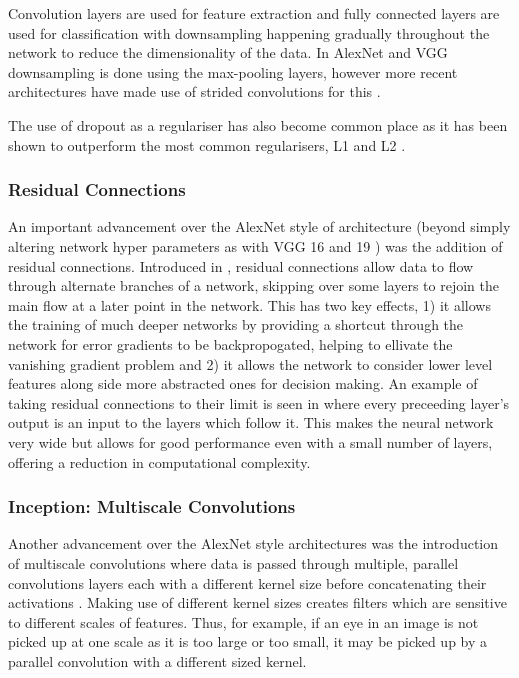 Convolution layers are used for feature extraction and fully connected layers are used for classification with downsampling happening gradually throughout the network to reduce the dimensionality of the data. In AlexNet and VGG downsampling is done using the max-pooling layers, however more recent architectures have made use of strided convolutions for this \cite{springenberg2014striving}.

The use of dropout as a regulariser has also become common place as it has been shown to outperform the most common regularisers, L1 and L2 \cite{srivastava2014dropout}.

\subsubsection{Residual Connections}
An important advancement over the AlexNet style of architecture (beyond simply altering network hyper parameters as with VGG 16 and 19 \cite{simonyan2014very}) was the addition of residual connections. Introduced in \cite{he2016deep}, residual connections allow data to flow through alternate branches of a network, skipping over some layers to rejoin the main flow at a later point in the network. This has two key effects, 1) it allows the training of much deeper networks by providing a shortcut through the network for error gradients to be backpropogated, helping to ellivate the vanishing gradient problem \cite{hochreiter1998vanishing} and 2) it allows the network to consider lower level features along side more abstracted ones for decision making.
An example of taking residual connections to their limit is seen in \cite{huang2017densely} where every preceeding layer's output is an input to the layers which follow it. This makes the neural network very wide but allows for good performance even with a small number of layers, offering a reduction in computational complexity.

\subsubsection{Inception: Multiscale Convolutions}
Another advancement over the AlexNet style architectures was the introduction of multiscale convolutions where data is passed through multiple, parallel convolutions layers each with a different kernel size before concatenating their activations \cite{szegedy2015going}. Making use of different kernel sizes creates filters which are sensitive to different scales of features. Thus, for example, if an eye in an image is not picked up at one scale as it is too large or too small, it may be picked up by a parallel convolution with a different sized kernel.


